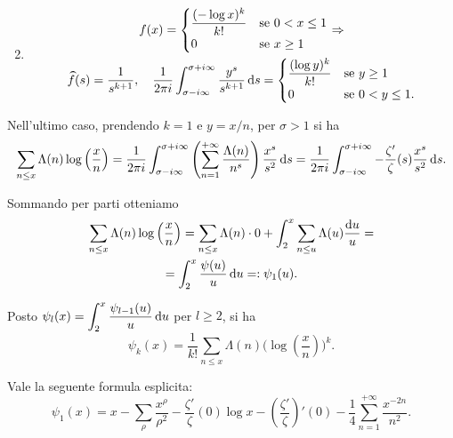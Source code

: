 \begin{ex}
\begin{enumerate}
\begin{gather*}
    \end{gather*}
    \item
    \begin{gather*}
      f(x)=\begin{cases}
        \dfrac{(-\log{x})^k}{k!} &\mbox{se } 0<x \le 1 \\
        0 &\mbox{se } x \ge 1
      \end{cases} \implies \\
      \wideparen{f}(s)=\frac{1}{s^{k+1}}, \quad \frac{1}{2\pi i} \int_{\sigma-i\infty}^{\sigma+i\infty} \frac{y^s}{s^{k+1}}\diff s=\begin{cases}
        \dfrac{(\log{y})^k}{k!} &\mbox{se } y \ge 1 \\
        0 &\mbox{se } 0<y \le 1.
      \end{cases}
    \end{gather*}
  \end{enumerate}
\end{ex}

Nell'ultimo caso, prendendo $k=1$ e $y=x/n$, per $\sigma>1$ si ha
$$\sum_{n \le x} \Lambda(n)\log\left(\frac{x}{n}\right)=\frac{1}{2\pi i}\int_{\sigma-i\infty}^{\sigma+i\infty} \left(\sum_{n=1}^{+\infty} \frac{\Lambda(n)}{n^s}\right)\frac{x^s}{s^2}\mathop{}\!\mathrm{d} s=\frac{1}{2\pi i}\int_{\sigma-i\infty}^{\sigma+i\infty} -\frac{\zeta'}{\zeta}(s)\frac{x^s}{s^2}\mathop{}\!\mathrm{d} s.$$

\begin{oss} \label{psiuno}
  Sommando per parti otteniamo
  \begin{gather*}
    \sum_{n \le x} \Lambda(n)\log\left(\frac{x}{n}\right)=\sum_{n \le x} \Lambda(n) \cdot 0+\int_2^x \sum_{n \le u} \Lambda(u)\frac{\mathop{}\!\mathrm{d} u}{u}= \\
    =\int_2^x \frac{\psi(u)}{u}\mathop{}\!\mathrm{d} u=:\psi_1(u).
  \end{gather*}
\end{oss}

\begin{oss}
  Posto $\displaystyle \psi_l(x)=\int_2^x \frac{\psi_{l-1}(u)}{u}\mathop{}\!\mathrm{d} u$ per $l \ge 2$, si ha
  $$\psi_k(x)=\frac{1}{k!}\sum_{n \le x} \Lambda(n)\Bigg(\log\left(\frac{x}{n}\right)\Bigg)^k.$$
\end{oss}

\begin{prop}
  Vale la seguente formula esplicita:
  $$\psi_1(x)=x-\sum_{\rho} \frac{x^{\rho}}{\rho^2}-\frac{\zeta'}{\zeta}(0)\log{x}-\left(\frac{\zeta'}{\zeta}\right)'(0)-\frac{1}{4}\sum_{n=1}^{+\infty} \frac{x^{-2n}}{n^2}.$$
\end{prop}

